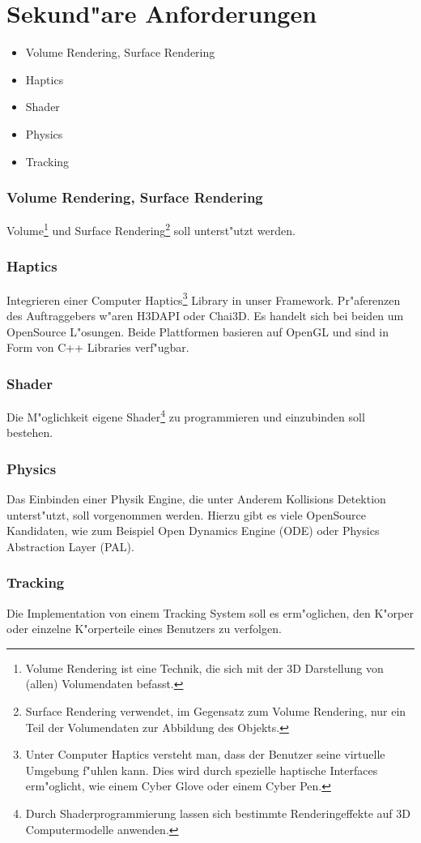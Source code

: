 \section{Sekund"are Anforderungen}

\begin{itemize}
\item Volume Rendering, Surface Rendering
\item Haptics
\item Shader
\item Physics
\item Tracking
\end{itemize}

\subsubsection{Volume Rendering, Surface Rendering}
Volume\footnote{Volume Rendering ist eine Technik, die sich mit der 3D Darstellung von (allen) Volumendaten befasst.} und Surface Rendering\footnote{Surface Rendering verwendet, im Gegensatz zum Volume Rendering, nur ein Teil der Volumendaten zur Abbildung des Objekts.} soll unterst"utzt werden. 

\subsubsection{Haptics}
Integrieren einer Computer Haptics\footnote{Unter Computer Haptics versteht man, dass der Benutzer seine virtuelle Umgebung f"uhlen kann. Dies wird durch spezielle haptische Interfaces erm"oglicht, wie einem Cyber Glove oder einem Cyber Pen.} Library in unser Framework. Pr"aferenzen des Auftraggebers w"aren H3DAPI oder Chai3D. Es handelt sich bei beiden um OpenSource L"osungen. Beide Plattformen basieren auf OpenGL und sind in Form von C++ Libraries verf"ugbar.


\subsubsection{Shader}
Die M"oglichkeit eigene Shader\footnote{Durch Shaderprogrammierung lassen sich bestimmte Renderingeffekte auf 3D Computermodelle anwenden.} zu programmieren und einzubinden soll bestehen.

\subsubsection{Physics}
Das Einbinden einer Physik Engine, die unter Anderem Kollisions Detektion unterst"utzt, soll vorgenommen werden. Hierzu gibt es viele OpenSource Kandidaten, wie zum Beispiel Open Dynamics Engine (ODE) oder Physics Abstraction Layer (PAL).

\subsubsection{Tracking}
Die Implementation von einem Tracking System soll es erm"oglichen, den K"orper oder einzelne K"orperteile eines Benutzers zu verfolgen. 
